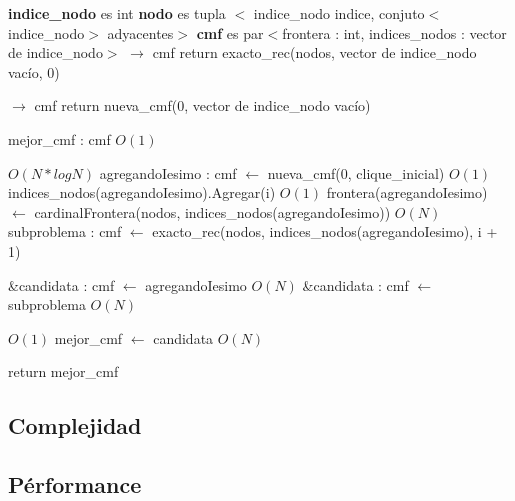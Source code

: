 \documentclass[a4paper, 10pt, twoside]{article}
\newenvironment{pseudo}[1][]{%
    \vspace{1em}%
    \begin{algorithmic}%
}
{%
    \end{algorithmic}%
    \vspace{1em}%
}
\newcommand{\Ode}[1]{\hfill $O(#1)$}
\begin{document}
\begin{pseudo}
\State \textbf{indice\_nodo} es int
\State \textbf{nodo} es tupla $<$ indice\_nodo indice, conjuto$<$indice\_nodo$>$ adyacentes$>$
\State \textbf{cmf} es par$<$frontera : int, indices\_nodos : vector de indice\_nodo$>$
\State
{} $\rightarrow$ cmf
	\State return exacto\_rec(nodos, vector de indice\_nodo vacío, 0)
\State
\EndProcedure

 $\rightarrow$ cmf
	 return nueva\_cmf(0, vector de indice\_nodo vacío) \EndIf

	\State mejor\_cmf : cmf									\Ode{1}

		 \Ode{N * log N}
			\State agregandoIesimo : cmf $\leftarrow$ nueva\_cmf(0, clique\_inicial)	\Ode{1}
			\State indices\_nodos(agregandoIesimo).Agregar(i)	\Ode{1}
			\State frontera(agregandoIesimo) $\leftarrow$
					cardinalFrontera(nodos, indices\_nodos(agregandoIesimo))	\Ode{N}
			\State subproblema : cmf $\leftarrow$
					exacto\_rec(nodos, indices\_nodos(agregandoIesimo), i + 1)

				\State \&candidata : cmf $\leftarrow$ agregandoIesimo			\Ode{N}
			\Else 
				\State \&candidata : cmf $\leftarrow$ subproblema				\Ode{N}
			\EndIf

			 \Ode{1}
				\State mejor\_cmf $\leftarrow$ candidata	\Ode{N}
			\EndIf
		\EndIf
	\EndFor

	\State return mejor\_cmf
\EndProcedure
\end{pseudo}

\subsection{Complejidad}

\subsection{Pérformance}
\end{document}
